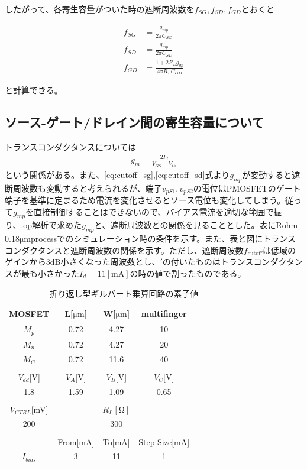 \documentclass[twocolumn]{jsarticle}
\begin{document}
したがって、各寄生容量がついた時の遮断周波数を$f_{SG},f_{SD},f_{GD}$とおくと

\begin{align}
    f_{SG} &= \frac{g_{mp}}{2\pi C_{SG}}    \label{eq:cutoff_sg}\\
    f_{SD} &= \frac{g_{mp}}{2\pi C_{SD}}    \label{eq:cutoff_sd}\\
    f_{GD} &= \frac{1+2R_{L}g_{dp}}{4\pi R_{L}C_{GD}}      \label{eq:cutoff_gd}
\end{align}

と計算できる。

\subsection{ソース-ゲート/ドレイン間の寄生容量について}
    トランスコンダクタンスについては
    \begin{align*}
        g_{m}=\frac{2I_{d}}{V_{GS}-V_{th}}
    \end{align*}
    という関係がある。また、\eqref{eq:cutoff_sg},\eqref{eq:cutoff_sd}式より$g_{mp}$が変動すると遮断周波数も変動すると考えられるが、端子$v_{pS1},v_{pS2}$の電位はPMOSFETのゲート端子を基準に定まるため電流を変化させるとソース電位も変化してしまう。従って$g_{mp}$を直接制御することはできないので、バイアス電流を適切な範囲で振り、.op解析で求めた$g_{mp}$と、遮断周波数との関係を見ることとした。表\nobreak{}にRohm 0.18$\mathrm{\mu m}$processでのシミュレーション時の条件を示す。また、表と図にトランスコンダクタンスと遮断周波数の関係を示す。ただし、遮断周波数$f_{\mathrm{cutoff}}$は低域のゲインから$3\mathrm{dB}$小さくなった周波数とし、$\prime$の付いたものはトランスコンダクタンスが最も小さかった$I_{d}=11\mathrm{[mA]}$の時の値で割ったものである。

    \begin{table}[!h]
        \caption{折り返し型ギルバート乗算回路の素子値}
        \label{table:sim_s_g/d}
        \centering
        \begin{tabular}{cccccccccc}
            MOSFET & L[$\mathrm{\mu m}$] & W[$\mathrm{\mu m}$] & multifinger\\
            \hline \hline
            $M_{p}$ & 0.72 & 4.27 & 10 \\
            $M_{n}$ & 0.72 & 4.27 & 20 \\
            $M_{C}$ & 0.72 & 11.6 & 40 \\
            &&&\\
            $V_{dd}$[V] & $V_{A}$[V] & $V_{B}$[V] & $V_{C}$[V]\\
            \hline\hline
            1.8 & 1.59 & 1.09 & 0.65 \\
            &&&\\
             $V_{CTRL}$[mV] & & $R_{L}[\mathrm{\Omega}]$ & \\
            \hline\hline
            200 & & 300 &\\
            &&&\\
             & From[mA] & To[mA] & Step Size[mA]\\
            \hline\hline
            $I_{bias}$ & 3 & 11 & 1
        \end{tabular}
    \end{table}
\end{document}
